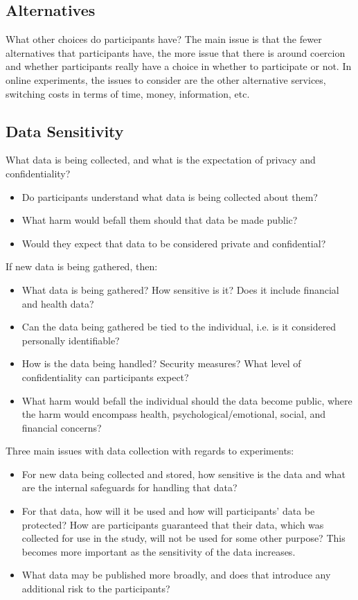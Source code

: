 \documentclass[10pt]{article}
\theoremstyle{definition}
\begin{document}
\subsection{Alternatives}
What other choices do participants have?
The main issue is that the fewer alternatives that participants have, the more issue that there is around coercion and whether participants really have a choice in whether to participate or not.
In online experiments, the issues to consider are the other alternative services, switching costs in terms of time, money, information, etc.

\subsection{Data Sensitivity}
What data is being collected, and what is the expectation of privacy and confidentiality?
\begin{itemize}
    \item Do participants understand what data is being collected about them?
    \item What harm would befall them should that data be made public?
    \item Would they expect that data to be considered private and confidential?
\end{itemize}
If new data is being gathered, then:
\begin{itemize}
    \item What data is being gathered? How sensitive is it? Does it include financial and health data?
    \item Can the data being gathered be tied to the individual, i.e. is it considered personally identifiable?
    \item How is the data being handled? Security measures? What level of confidentiality can participants expect?
    \item What harm would befall the individual should the data become public, where the harm would encompass health, psychological/emotional, social, and financial concerns?
\end{itemize}
Three main issues with data collection with regards to experiments:
\begin{itemize}
    \item For new data being collected and stored, how sensitive is the data and what are the internal safeguards for handling that data?
    \item For that data, how will it be used and how will participants' data be protected? How are participants guaranteed that their data, which was collected for use in the study, will not be used for some other purpose? This becomes more important as the sensitivity of the data increases.
    \item What data may be published more broadly, and does that introduce any additional risk to the participants?
\end{itemize}
\end{document}
